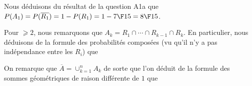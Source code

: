 {{\stopformula
\item%
\startList%
\item Nous déduisons du résultat de la question A1a que 
$P(A_1)=P(\overline{R_1})=1-P(R_1)=1-{7\F15}={8\F 15}$. 
\item Pour $⩾2$, nous remarquons que $A_k=R_1∩⋯∩R_{k-1}∩R_k$. En particulier, nous déduisons de la formule des probabilités composées (vu qu'il n'y a pas indépendance entre les $R_i$) que 
\startformula
{}
\stopformula
\item On remarque que $\overline{A}=∪_{k=1}^nA_k$ de sorte que l'on déduit de la formule des sommes géométriques de raison différente de $1$ que  
\startformula
{}
\stopformula
\stopList%
\stopList%
\stopList%

}}
